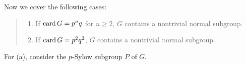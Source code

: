 \begin{solution}
  Now we cover the following cases:
  \begin{quote}
    \begin{claim*}
      \hfill
      \begin{enumerate}[label=\textnormal{(\alph*)},noitemsep]
      \item If \(\operatorname{card} G=p^nq\) for \(n\geq 2\), \(G\) contains a
        nontrivial normal subgroup.
      \item If \(\operatorname{card} G=p^2q^2\), \(G\) contains a nontrivial normal
        subgroup.
      \end{enumerate}
    \end{claim*}
  \end{quote}
  \begin{subproof}
    For (a), consider the \(p\)-Sylow subgroup \(P\) of \(G\).
  \end{subproof}
\end{solution}

